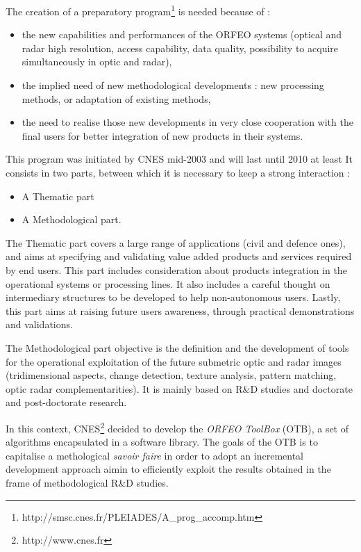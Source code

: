The creation of a preparatory
program\footnote{http://smsc.cnes.fr/PLEIADES/A\_prog\_accomp.htm} is needed
because of :
\begin{itemize}
\item the new capabilities and performances of the ORFEO systems (optical and
radar high resolution, access capability, data quality, possibility to acquire
simultaneously in optic and radar),
\item the implied need of new methodological developments : new processing
methods, or adaptation of existing methods,
\item the need to realise those new developments in very close
  cooperation with the final users for better integration of new products in
their systems.

\end{itemize}

This program was initiated by CNES mid-2003 and will last until 2010 at least
It consists in two parts, between which it is necessary to keep a strong
interaction :
\begin{itemize}
\item A Thematic part
\item A Methodological part.
\end{itemize}

The Thematic part covers a large range of applications (civil and
defence ones), and aims at specifying and validating value added
products and services required by end users. This part includes
consideration about products integration in the operational systems or
processing lines. It also includes a careful thought on intermediary
structures to be developed to help non-autonomous users. Lastly, this part aims
at raising future users awareness, through practical demonstrations and
validations.

The Methodological part objective is the definition and the
development of tools for the operational exploitation of the future
submetric optic and radar images (tridimensional aspects, change
detection, texture analysis, pattern matching, optic radar
complementarities). It is mainly based on R\&D studies and doctorate
and post-doctorate research.

In this context, CNES\footnote{http://www.cnes.fr} decided to develop
the \emph{ORFEO ToolBox} (OTB), a set of algorithms encapsulated in a
software library. The goals of the OTB is to capitalise a methological
\textit{savoir faire} in order to adopt an incremental development
approach aimin to efficiently exploit the results obtained in the
frame of methodological R\&D studies.

